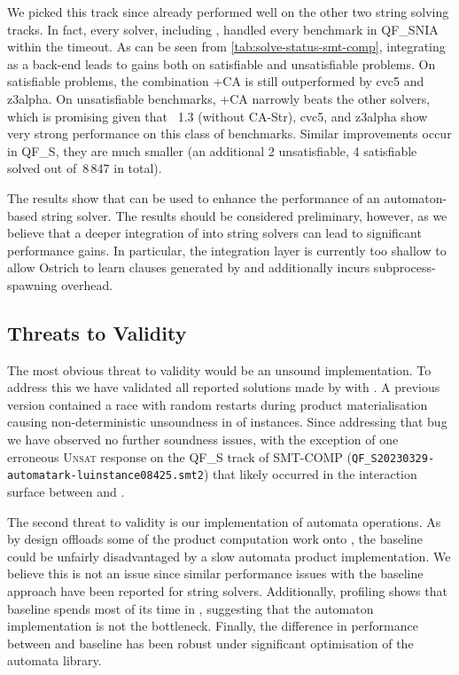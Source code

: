 We picked this track since
\Ostrich{} already performed well on the other two string solving tracks. In fact,
every solver, including \Ostrich{}, handled every benchmark in QF\_SNIA within the timeout.
%
As can be seen from \cref{tab:solve-status-smt-comp}, integrating \Catra{} as a back-end
leads to gains both on satisfiable and unsatisfiable problems. On
satisfiable problems, the combination \Ostrich+CA is still
outperformed by cvc5 and z3alpha. On unsatisfiable benchmarks,
\Ostrich+CA narrowly beats the other solvers,
which is promising given that \Ostrich{}~1.3 (without CA-Str), cvc5, and z3alpha show very strong
performance on this class of benchmarks. Similar improvements
occur in QF\_S, they are much smaller (an additional 2 unsatisfiable, 4 satisfiable 
solved out of~8\,847 in total).

The results show that \Calculus{} can be used to enhance the performance of an
automaton-based string solver. The results should be considered preliminary,
however, as we believe that a deeper integration of \Catra{} into string solvers
can lead to significant performance gains. In particular, the integration layer 
is currently too shallow to allow Ostrich to learn clauses generated by \Catra{}
and additionally incurs subprocess-spawning overhead.

\subsection{Threats to Validity}

The most obvious threat to validity would be an unsound implementation. To
address this we have validated all reported solutions made by \Calculus{} with
\Nuxmv{}. A previous version contained a race with random restarts during
product materialisation causing non-deterministic unsoundness in 
of instances. Since addressing that bug we have observed no further soundness
issues, with the exception of one erroneous \textsc{Unsat} response on the QF\_S track of 
SMT-COMP (\texttt{QF\_S\/20230329-automatark-lu\/instance08425.smt2}) that likely occurred
in the interaction surface between \Ostrich{} and \Catra{}.

The second threat to validity is our implementation of automata operations. As
\Calculus{} by design offloads some of the product computation work onto
\Princess{}, the baseline could be unfairly disadvantaged by a slow automata
product implementation. We believe this is not an issue since similar
performance issues with the baseline approach have been reported for string
solvers. Additionally, profiling shows that baseline spends most of its time in
\Princess{}, suggesting that the automaton implementation is not the bottleneck.
Finally, the difference in performance between \Calculus{} and baseline has been
robust under significant optimisation of the automata library.

